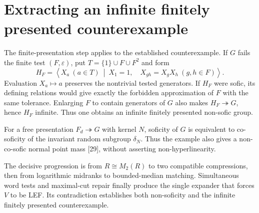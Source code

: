 \documentclass[10pt,openany]{book}
\newcommand{\refnum}[1]{\textnormal{[#1]}}
\begin{document}
\section{Extracting an infinite finitely presented counterexample}

The finite-presentation step applies to the established counterexample. If $G$ fails the finite test $(F,\varepsilon)$, put $T=\{1\}\cup F\cup F^2$ and form
\[
 H_F=
 \left\langle
 X_a\ (a\in T)
 \ \middle|\ 
 X_1=1,\quad X_{gh}=X_gX_h\ (g,h\in F)
 \right\rangle.
\]
Evaluation $X_a\mapsto a$ preserves the nontrivial tested generators. If $H_F$ were sofic, its defining relations would give exactly the forbidden approximation of $F$ with the same tolerance. Enlarging $F$ to contain generators of $G$ also makes $H_F\twoheadrightarrow G$, hence $H_F$ infinite. Thus one obtains an infinite finitely presented non-sofic group.

For a free presentation $F_d\twoheadrightarrow G$ with kernel $N$, soficity of $G$ is equivalent to co-soficity of the invariant random subgroup $\delta_N$. Thus the example also gives a non-co-sofic normal point mass \refnum{29}, without asserting non-hyperlinearity.

The decisive progression is from $R\cong M_2(R)$ to two compatible compressions, then from logarithmic midranks to bounded-median matching. Simultaneous word tests and maximal-cut repair finally produce the single expander that forces $V$ to be LEF\@. Its contradiction establishes both non-soficity and the infinite finitely presented counterexample.
\end{document}
